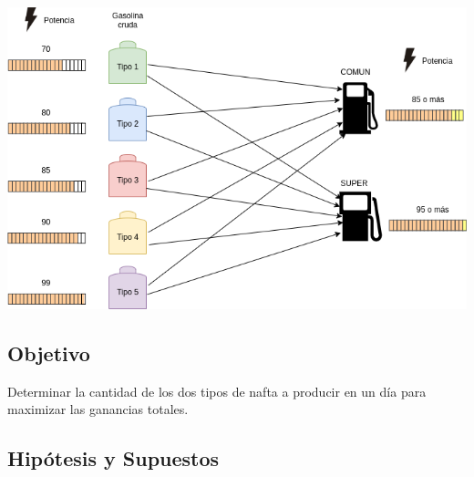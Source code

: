 \documentclass[
]{article}
\begin{document}
\includegraphics{img/nafta.png}

\hypertarget{objetivo}{%
\subsection{Objetivo}\label{objetivo}}

Determinar la cantidad de los dos tipos de nafta a producir en un día
para maximizar las ganancias totales.

\hypertarget{hipuxf3tesis-y-supuestos}{%
\subsection{Hipótesis y Supuestos}\label{hipuxf3tesis-y-supuestos}}
\end{document}
